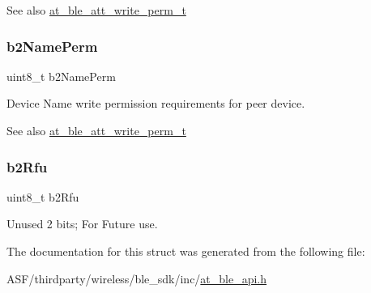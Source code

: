\begin{DoxySeeAlso}{See also}
\mbox{\hyperlink{at__ble__api_8h_acd9a0371335811dbc90e98a7802a8968}{at\+\_\+ble\+\_\+att\+\_\+write\+\_\+perm\+\_\+t}} 
\end{DoxySeeAlso}
\mbox{\label{structat__ble__att__cfg__t_a9b58d5c2c5cfd7bd60bab8edee6062c9}} 
\subsubsection{\texorpdfstring{b2NamePerm}{b2NamePerm}}
{\footnotesize\ttfamily uint8\+\_\+t b2\+Name\+Perm}



Device Name write permission requirements for peer device. 

\begin{DoxySeeAlso}{See also}
\mbox{\hyperlink{at__ble__api_8h_acd9a0371335811dbc90e98a7802a8968}{at\+\_\+ble\+\_\+att\+\_\+write\+\_\+perm\+\_\+t}} 
\end{DoxySeeAlso}
\mbox{\label{structat__ble__att__cfg__t_a7f14ba672570388a12b47fd7c0333581}} 
\subsubsection{\texorpdfstring{b2Rfu}{b2Rfu}}
{\footnotesize\ttfamily uint8\+\_\+t b2\+Rfu}



Unused 2 bits; For Future use. 



The documentation for this struct was generated from the following file\+:\begin{DoxyCompactItemize}
\item 
A\+S\+F/thirdparty/wireless/ble\+\_\+sdk/inc/\mbox{\hyperlink{at__ble__api_8h}{at\+\_\+ble\+\_\+api.\+h}}\end{DoxyCompactItemize}
